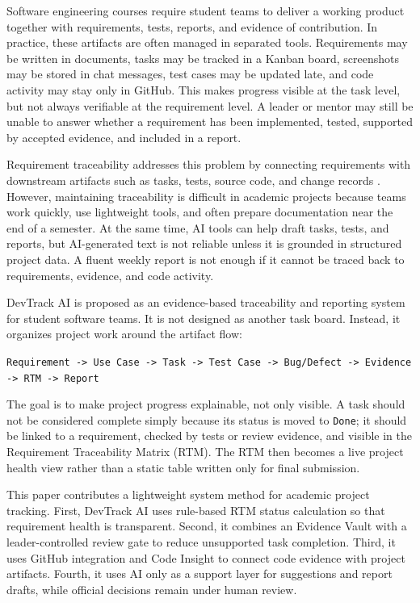 \documentclass[runningheads]{llncs}
\begin{document}
Software engineering courses require student teams to deliver a working product
together with requirements, tests, reports, and evidence of contribution. In
practice, these artifacts are often managed in separated tools. Requirements may be
written in documents, tasks may be tracked in a Kanban board, screenshots may be
stored in chat messages, test cases may be updated late, and code activity may stay
only in GitHub. This makes progress visible at the task level, but not always
verifiable at the requirement level. A leader or mentor may still be unable to
answer whether a requirement has been implemented, tested, supported by accepted
evidence, and included in a report.

Requirement traceability addresses this problem by connecting requirements with
downstream artifacts such as tasks, tests, source code, and change records
\cite{nlpTraceability,crossLevelTraceability}. However, maintaining traceability is
difficult in academic projects because teams work quickly, use lightweight tools,
and often prepare documentation near the end of a semester. At the same time, AI
tools can help draft tasks, tests, and reports, but AI-generated text is not reliable
unless it is grounded in structured project data. A fluent weekly report is not
enough if it cannot be traced back to requirements, evidence, and code activity.

DevTrack AI is proposed as an evidence-based traceability and reporting system for
student software teams. It is not designed as another task board. Instead, it
organizes project work around the artifact flow:

\begin{center}
\texttt{Requirement -> Use Case -> Task -> Test Case -> Bug/Defect -> Evidence -> RTM -> Report}
\end{center}

The goal is to make project progress explainable, not only visible. A task should
not be considered complete simply because its status is moved to \texttt{Done}; it
should be linked to a requirement, checked by tests or review evidence, and visible
in the Requirement Traceability Matrix (RTM). The RTM then becomes a live project
health view rather than a static table written only for final submission.

This paper contributes a lightweight system method for academic project tracking.
First, DevTrack AI uses rule-based RTM status calculation so that requirement health
is transparent. Second, it combines an Evidence Vault with a leader-controlled
review gate to reduce unsupported task completion. Third, it uses GitHub integration
and Code Insight to connect code evidence with project artifacts. Fourth, it uses AI
only as a support layer for suggestions and report drafts, while official decisions
remain under human review.
\end{document}
